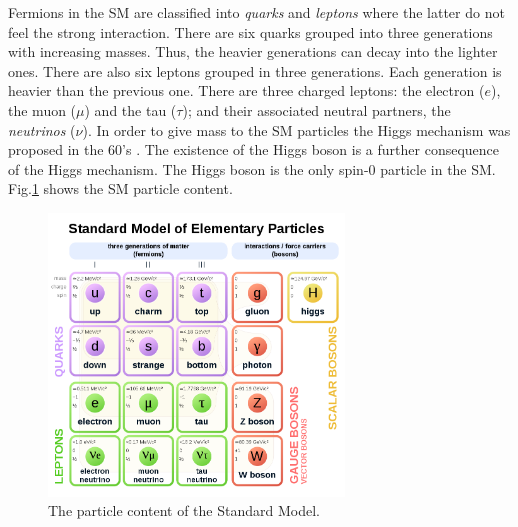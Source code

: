 Fermions in the SM are classified into \textit{quarks} and \textit{leptons} where the latter do not feel the strong interaction. There are six quarks grouped into three generations with increasing masses. Thus, the heavier generations can decay into the lighter ones. There are also six leptons grouped in three generations. Each generation is heavier than the previous one. There are three charged leptons: the electron ($e$), the muon ($\mu$) and the tau ($\tau$); and their associated neutral partners, the \textit{neutrinos} ($\nu$). In order to give mass to the SM particles the Higgs mechanism was proposed in the 60's \cite{PhysRevLett.13.508,PhysRevLett.13.321,PhysRevLett.13.585}. The existence of the Higgs boson is a further consequence of the Higgs mechanism. The Higgs boson is the only spin-0 particle in the SM. Fig.\ref{Fig14} shows the SM particle content.
\begin{figure}[h]
	\centering
	\includegraphics[width=0.7\textwidth]{figures/Fig14}
	\caption{The particle content of the Standard Model.}
	\label{Fig14}
\end{figure}
